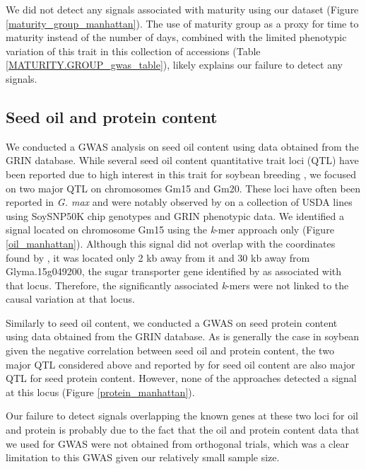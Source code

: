 \documentclass[12pt]{article}
\begin{document}
We did not detect any signals associated with maturity using our dataset
(Figure \ref{maturity_group_manhattan}). The use of maturity group as a proxy
for time to maturity instead of the number of days, combined with the limited
phenotypic variation of this trait in this collection of accessions (Table
\ref{MATURITY.GROUP_gwas_table}), likely explains our failure to detect
any signals.

\subsection*{Seed oil and protein content}
\label{sv-gwas-seed-oil-protein-content}

We conducted a GWAS analysis on seed oil content using data obtained from the
GRIN database. While several seed oil content quantitative trait loci (QTL)
have been reported due to high interest in this trait for soybean breeding
, we focused on two major QTL on chromosomes Gm15 and Gm20.
These loci have often been reported in \emph{G. max} and were notably observed by
 on a collection of USDA lines using SoySNP50K chip
genotypes and GRIN phenotypic data. We identified a signal located on
chromosome Gm15 using the \emph{k}-mer approach only (Figure
\ref{oil_manhattan}). Although this signal did not overlap with the coordinates
found by , it was located only 2 kb away from it and 30 kb
away from Glyma.15g049200, the sugar transporter gene identified by
 as associated with that locus. Therefore, the significantly
associated \emph{k}-mers were not linked to the causal variation at that locus.

Similarly to seed oil content, we conducted a GWAS on seed protein content
using data obtained from the GRIN database. As is generally the case in
soybean given the negative correlation between seed oil and protein content,
the two major QTL considered above and reported by  for seed
oil content are also major QTL for seed protein content. However, none of the
approaches detected a signal at this locus (Figure \ref{protein_manhattan}).

Our failure to detect signals overlapping the known genes at these two loci for
oil and protein is probably due to the fact that the oil and protein content
data that we used for GWAS were not obtained from orthogonal trials, which was
a clear limitation to this GWAS given our relatively small sample size. 
\end{document}
